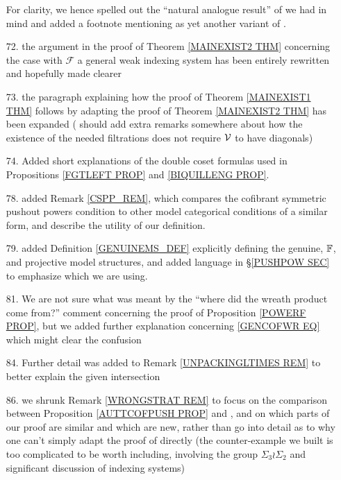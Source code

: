 \documentclass{article}
\begin{document}
\begin{itemize}
	For clarity, we hence spelled out the ``natural analogue result'' of \cite[Thm. 11.3.2]{Hi03} we had in mind
	and added a footnote mentioning \cite[Thm. 2]{Spi01} as yet another variant of \cite[Thm. 11.3.2]{Hi03}.
	
	
	
        
	\item[72.] the argument in the proof of Theorem \ref{MAINEXIST2 THM}
	concerning the case with $\mathcal{F}$
	a general weak indexing system has been entirely rewritten and hopefully made clearer
	
	\item[73.] the paragraph explaining how the proof of 
	Theorem \ref{MAINEXIST1 THM}
	follows by adapting the proof of 
	Theorem \ref{MAINEXIST2 THM}
	has been expanded
	({\color{red} should add extra remarks somewhere about how the existence of the needed filtrations does not require $\mathcal V$ to have diagonals})

	\item[74.] Added short explanations of the double coset formulas used in 
	Propositions \ref{FGTLEFT PROP} and \ref{BIQUILLENG PROP}.

        \item[78.] added Remark \ref{CSPP_REM}, which compares the cofibrant symmetric pushout powers condition to other model categorical conditions of a similar form, and describe the utility of our definition.

        \item[79.] added Definition \ref{GENUINEMS_DEF} explicitly defining the genuine, $\mathbb{F}$, and projective model structures,
              and added language in \S \ref{PUSHPOW SEC} to emphasize which we are using.
	
	\item[81.] We are not sure what was meant by the 
	``where did the wreath product come from?'' comment
	concerning the proof of Proposition \ref{POWERF PROP},
	but we added further explanation concerning
	\eqref{GENCOFWR EQ} which might clear the confusion
	
	\item[84.] Further detail was added 
	to Remark \ref{UNPACKINGLTIMES REM} to better explain the given intersection
	
	\item[86.] we shrunk Remark \ref{WRONGSTRAT REM} 
	to focus on the comparison between Proposition \ref{AUTTCOFPUSH PROP} and \cite[Lemma 5.9]{BM08},
	and on which parts of our proof are similar and which are new,
	rather than go into detail as to why one can't simply adapt the proof of \cite[Lemma 5.9]{BM08} directly
	(the counter-example we built 
	is too complicated to be worth including,
	involving the group 
	$\Sigma_3 \wr \Sigma_2$ and 
	significant discussion of indexing systems)	
	

\end{itemize}
\end{document}
